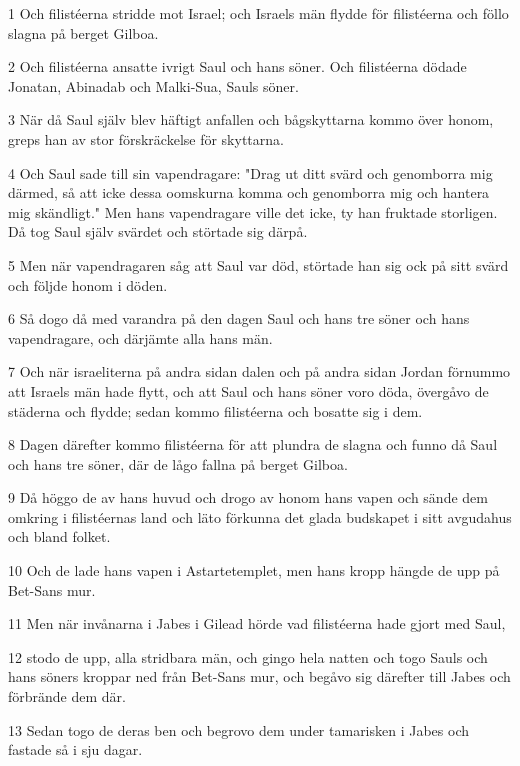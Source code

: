 \par 1 Och filistéerna stridde mot Israel; och Israels män flydde för filistéerna och föllo slagna på berget Gilboa.
\par 2 Och filistéerna ansatte ivrigt Saul och hans söner. Och filistéerna dödade Jonatan, Abinadab och Malki-Sua, Sauls söner.
\par 3 När då Saul själv blev häftigt anfallen och bågskyttarna kommo över honom, greps han av stor förskräckelse för skyttarna.
\par 4 Och Saul sade till sin vapendragare: "Drag ut ditt svärd och genomborra mig därmed, så att icke dessa oomskurna komma och genomborra mig och hantera mig skändligt." Men hans vapendragare ville det icke, ty han fruktade storligen. Då tog Saul själv svärdet och störtade sig därpå.
\par 5 Men när vapendragaren såg att Saul var död, störtade han sig ock på sitt svärd och följde honom i döden.
\par 6 Så dogo då med varandra på den dagen Saul och hans tre söner och hans vapendragare, och därjämte alla hans män.
\par 7 Och när israeliterna på andra sidan dalen och på andra sidan Jordan förnummo att Israels män hade flytt, och att Saul och hans söner voro döda, övergåvo de städerna och flydde; sedan kommo filistéerna och bosatte sig i dem.
\par 8 Dagen därefter kommo filistéerna för att plundra de slagna och funno då Saul och hans tre söner, där de lågo fallna på berget Gilboa.
\par 9 Då höggo de av hans huvud och drogo av honom hans vapen och sände dem omkring i filistéernas land och läto förkunna det glada budskapet i sitt avgudahus och bland folket.
\par 10 Och de lade hans vapen i Astartetemplet, men hans kropp hängde de upp på Bet-Sans mur.
\par 11 Men när invånarna i Jabes i Gilead hörde vad filistéerna hade gjort med Saul,
\par 12 stodo de upp, alla stridbara män, och gingo hela natten och togo Sauls och hans söners kroppar ned från Bet-Sans mur, och begåvo sig därefter till Jabes och förbrände dem där.
\par 13 Sedan togo de deras ben och begrovo dem under tamarisken i Jabes och fastade så i sju dagar.


